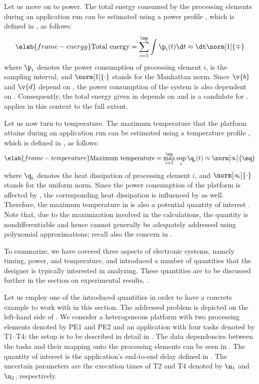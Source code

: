 Let us move on to power. The total energy consumed by the \np processing
elements during an application run can be estimated using a power profile \mp,
which is defined in , as follows:
\begin{equation} \elab{frame-energy}
  \text{Total energy}
  = \sum_{i = 1}^\np \int \p_i(t) \d t
  \approx \dt \norm[1]{\mp}
\end{equation}
where $\p_i$ denotes the power consumption of processing element $i$, \dt is the
sampling interval, and $\norm[1]{\cdot}$ stands for the Manhattan norm. Since
$\v{b}$ and $\v{d}$ depend on \vu, the power consumption of the system is also
dependent on \vu. Consequently, the total energy given in 
depends on \vu and is a candidate for \g.  applies in
this context to the full extent.

Let us now turn to temperature. The maximum temperature that the platform
attains during an application run can be estimated using a temperature profile
\mq, which is defined in , as follows:
\begin{equation} \elab{frame-temperature}
  \text{Maximum temperature}
  = \max_{i = 1}^\np \sup_{t} \q_i(t)
  \approx \norm[\infty]{\mq}
\end{equation}
where $\q_i$ denotes the heat dissipation of processing element $i$, and
$\norm[\infty]{\cdot}$ stands for the uniform norm. Since the power consumption
of the platform is affected by \vu, the corresponding heat dissipation is
influenced by \vu as well. Therefore, the maximum temperature in
 is also a potential quantity of interest \g. Note that,
due to the maximization involved in the calculations, the quantity is
nondifferentiable and hence cannot generally be adequately addressed using
polynomial approximations; recall also the concern in
.

To summarize, we have covered three aspects of electronic systems, namely
timing, power, and temperature, and introduced a number of quantities that the
designer is typically interested in analyzing. These quantities are to be
discussed further in the section on experimental results, .

Let us employ one of the introduced quantities in order to have a concrete
example to work with in this section. The addressed problem is depicted on the
left-hand side of . We consider a heterogeneous platform
with two processing elements denoted by PE1 and PE2 and an application with four
tasks denoted by T1--T4; the setup is to be described in detail in
. The data dependencies between the tasks and their mapping
onto the processing elements can be seen in . The
quantity of interest \g is the application's end-to-end delay defined in
. The uncertain parameters \vu are the execution times of T2
and T4 denoted by $\u_1$ and $\u_2$, respectively.

